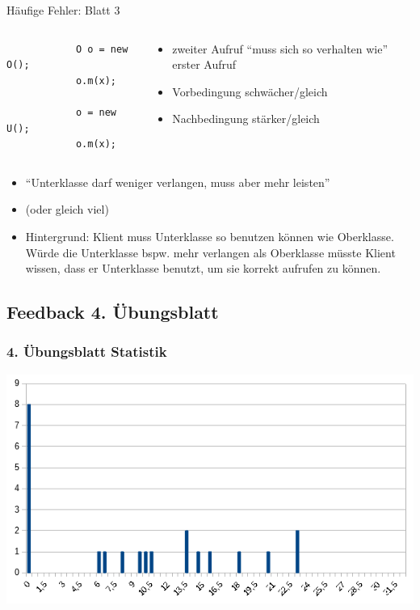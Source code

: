\documentclass[18pt]{beamer}
\begin{document}
\begin{frame}[fragile]{Häufige Fehler: Blatt 3}
	\begin{columns}
		\begin{column}{0.5\textwidth}
			\centering
			\begin{verbatim}
			O o = new O();
			o.m(x);
			
			o = new U(); 
			o.m(x);
			\end{verbatim}
		\end{column}%
		\begin{column}{0.5\textwidth}
			\begin{itemize}
				\item zweiter Aufruf \enquote{muss sich so verhalten wie} erster Aufruf
				\item Vorbedingung schwächer/gleich
				\item Nachbedingung stärker/gleich
			\end{itemize}
		\end{column}
	\end{columns}
	\pause
	\begin{itemize}
		\item \enquote{Unterklasse darf weniger verlangen, muss aber mehr leisten}
		\item (oder gleich viel)
		\item Hintergrund: Klient muss Unterklasse so benutzen können wie Oberklasse. Würde die Unterklasse bspw. mehr verlangen als Oberklasse müsste Klient wissen, dass er Unterklasse benutzt, um sie korrekt aufrufen zu können.
	\end{itemize}
\end{frame}


	\subsection{Feedback 4. Übungsblatt}
	\begin{frame}
		\frametitle{4. Übungsblatt Statistik}
		\includegraphics[scale=0.7]{./pics/tut4/statistics-ub4.png}
	\end{frame}
	
\end{document}
